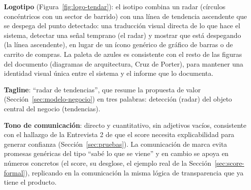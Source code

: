 \textbf{Logotipo} (Figura~\ref{fig:logo-tendar}): el isotipo combina un radar (círculos concéntricos con un sector de barrido) con una línea de tendencia ascendente que se despega del punto detectado: una traducción visual directa de lo que hace el sistema, detectar una señal temprano (el radar) y mostrar que está despegando (la línea ascendente), en lugar de un ícono genérico de gráfico de barras o de carrito de compras. La paleta de azules es consistente con el resto de las figuras del documento (diagramas de arquitectura, Cruz de Porter), para mantener una identidad visual única entre el sistema y el informe que lo documenta.

\textbf{Tagline}: ``radar de tendencias'', que resume la propuesta de valor (Sección~\ref{sec:modelo-negocio}) en tres palabras: detección (radar) del objeto central del negocio (tendencias).

\textbf{Tono de comunicación}: directo y cuantitativo, sin adjetivos vacíos, consistente con el hallazgo de la Entrevista 2 de que el score necesita explicabilidad para generar confianza (Sección~\ref{sec:pruebas}). La comunicación de marca evita promesas genéricas del tipo ``sabé lo que se viene'' y en cambio se apoya en números concretos (el score, su desglose, el ejemplo real de la Sección~\ref{sec:score-formal}), replicando en la comunicación la misma lógica de transparencia que ya tiene el producto.
